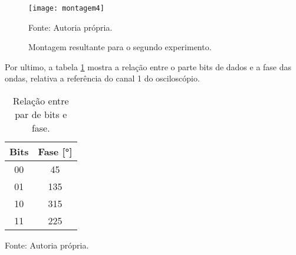 \begin{figure}[H]
  \centering
  \caption{Montagem resultante para o segundo experimento.}
  \texttt{[image: montagem4]}
  
  \small Fonte: Autoria própria.
  \label{fig:montagem4}
\end{figure}

Por ultimo, a tabela \ref{tab:fases} mostra a relação entre o parte bits de dados e a fase das ondas, relativa a referência do canal 1 do osciloscópio.

\begin{table}[H]
  \centering
  \caption{Relação entre par de bits e fase.}
  \label{tab:fases}
  \begin{tabular}{cc}
    \toprule
    Bits & Fase [°] \\
    \midrule
    00 & 45 \\
    01 & 135 \\
    10 & 315 \\
    11 & 225 \\
    \bottomrule
  \end{tabular}
  
  \small Fonte: Autoria própria.
\end{table}
